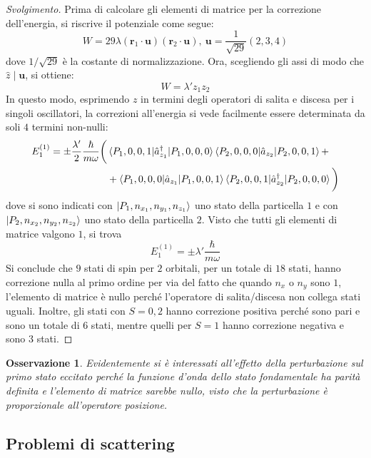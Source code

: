 \documentclass[11pt, a4paper]{scrartcl} %
\numberwithin{equation}{subsection}
\theoremstyle{style2}
\newtheorem{osservazione}{Osservazione}[section]
\theoremstyle{style1}
\renewcommand\qedsymbol{$\blacksquare$}
\newenvironment{svolgimento}{\renewcommand\qedsymbol{$\spadesuit$}\begin{proof}[Svolgimento]}{\end{proof}}
\begin{document}
\begin{enumerate}[(a).]
\begin{svolgimento}
			Prima di calcolare gli elementi di matrice per la correzione dell'energia, si riscrive il potenziale come segue:
			\[
			W = 29 \lambda (\mathbf{r} _1 \cdot \mathbf{u} ) (\mathbf{r} _2\cdot \mathbf{u} ), \ \mathbf{u} = \frac{1}{\sqrt{29} } (2,3,4)
			\] 
			dove $1 / \sqrt{29} $ \`e la costante di normalizzazione. 
			Ora, scegliendo gli assi di modo che $\hat{z}  \mid  \mathbf{u} $, si ottiene:
			\begin{equation}
				W = \lambda ' z_1z_2
			\end{equation}
			In questo modo, esprimendo $z$ in termini degli operatori di salita e discesa per i singoli oscillatori, la correzioni all'energia si vede facilmente essere determinata da soli $4$ termini non-nulli: 
\[
\begin{split}
	E^{(1)} _1 = \pm \frac{\lambda '}{2} \frac{\hbar }{m\omega} \bigg(&\braket{P_1,0,0,1|\hat{a}^\dagger _{z_1} |P_1,0,0,0}\braket{P_2,0,0,0|\hat{a}_{z_2} |P_2,0,0,1} +\\
	&+\braket{P_1,0,0,0|\hat{a}_{z_1} |P_1,0,0,1} \braket{P_2,0,0,1|\hat{a}_{z_2} ^\dagger |P_{2},0,0,0} \bigg)
\end{split}
\] 
dove si sono indicati con $\ket{P_1,n_{x_1} , n_{y_1}, n_{z_1}  } $ uno stato della particella $1$ e con $\ket{P_2,n_{x_2} , n_{y_2}, n_{z_2}  } $ uno stato della particella $2$.
Visto che tutti gli elementi di matrice valgono $1$, si trova
\[
E^{(1)} _1 = \pm \lambda ' \frac{\hbar }{m\omega}
\] 
Si conclude che $9$ stati di spin per $2$ orbitali, per un totale di $18$ stati, hanno correzione nulla al primo ordine per via del fatto che quando $n_x$ o $n_y$ sono $1$, l'elemento di matrice \`e nullo perch\'e l'operatore di salita/discesa non collega stati uguali.
Inoltre, gli stati con $S = 0,2$ hanno correzione positiva perch\'e sono pari e sono un totale di $6$ stati, mentre quelli per $S = 1$ hanno correzione negativa e sono $3$ stati.
		\end{svolgimento}
\end{enumerate}
\begin{osservazione}
		Evidentemente si \`e interessati all'effetto della perturbazione sul primo stato eccitato perch\'e la funzione d'onda dello stato fondamentale ha parit\`a definita e l'elemento di matrice sarebbe nullo, visto che la perturbazione \`e proporzionale all'operatore posizione.
\end{osservazione}
\subsection{Problemi di scattering}
\end{document}
